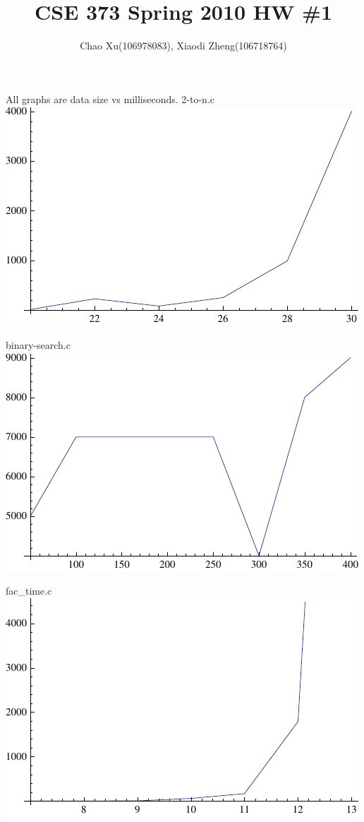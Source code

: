 \documentclass[letter]{article}
\title{CSE 373 Spring 2010 HW \#1}
\date{}
\author{Chao Xu(106978083), Xiaodi Zheng(106718764)}
\begin{document}
\maketitle
\vspace{-.5in}
\section{}
All graphs are data size vs milliseconds.
2-to-n.c\\
\includegraphics[scale=1]{2-to-n.pdf}

binary-search.c\\
\includegraphics[scale=1]{binarysearch.pdf}

fac_time.c\\
\includegraphics[scale=1]{fact.pdf}
\end{document}
